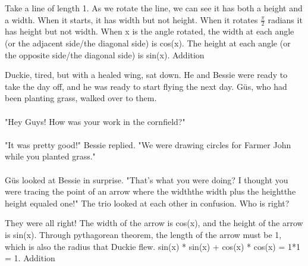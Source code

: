  {}
 {Take a line of length 1. As we rotate the line, we can see it has both a height and a width. When it starts, it has width but not height. When it rotates $\frac{\pi}{2}$ radians it has height but not width. When x is the angle rotated, the width at each angle (or the adjacent side/the diagonal side) is cos(x). The height at each angle (or the opposite side/the diagonal side) is sin(x).}
 {Addition}
 {Duckie, tired, but with a healed wing, sat down. He and Bessie were ready to take the day off, and he was ready to start flying the next day. Güs, who had been planting grass, walked over to them. 
 \paragraph{} "Hey Guys! How was your work in the cornfield?"
 \paragraph{} "It was pretty good!" Bessie replied. "We were drawing circles for Farmer John while you planted grass."
 \paragraph{} Güs looked at Bessie in surprise. "That's what you were doing? I thought you were tracing the point of an arrow where the width\texttimes the width plus the height\texttimes the height equaled one!"
 The trio looked at each other in confusion. Who is right?}
 {They were all right! The width of the arrow is cos(x), and the height of the arrow is sin(x). Through pythagorean theorem, the length of the arrow must be 1, which is also the radius that Duckie flew.}
 {sin(x) * sin(x) + cos(x) * cos(x) = 1*1 = 1.}
 {Addition}